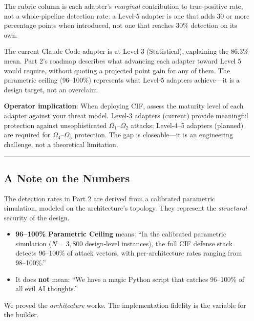 \documentclass[
]{article}
\providecommand{\tightlist}{%
  \setlength{\itemsep}{0pt}\setlength{\parskip}{0pt}}
\begin{document}
The rubric column is each adapter's \emph{marginal} contribution to
true-positive rate, not a whole-pipeline detection rate: a Level-5
adapter is one that adds 30 or more percentage points when introduced,
not one that reaches 30\% detection on its own.

The current Claude Code adapter is at Level 3 (Statistical), explaining
the 86.3\% mean. Part 2's roadmap describes what advancing each adapter
toward Level 5 would require, without quoting a projected point gain for
any of them. The parametric ceiling (96--100\%) represents what Level-5
adapters achieve---it is a design target, not an overclaim.

\textbf{Operator implication}: When deploying CIF, assess the maturity
level of each adapter against your threat model. Level-3 adapters
(current) provide meaningful protection against unsophisticated
\(\Omega_1\)--\(\Omega_2\) attacks; Level-4--5 adapters (planned) are
required for \(\Omega_4\)--\(\Omega_5\) protection. The gap is
closeable---it is an engineering challenge, not a theoretical
limitation.

\begin{center}\rule{0.5\linewidth}{0.5pt}\end{center}

\subsection{A Note on the Numbers}\label{a-note-on-the-numbers}

The detection rates in Part 2 are derived from a calibrated parametric
simulation, modeled on the architecture's topology. They represent the
\emph{structural} security of the design.

\begin{itemize}
\tightlist
\item
  \textbf{96--100\% Parametric Ceiling} means: ``In the calibrated
  parametric simulation (\(N=3{,}800\) design-level instances), the full
  CIF defense stack detects 96--100\% of attack vectors, with
  per-architecture rates ranging from 98--100\%.''
\item
  It does \textbf{not} mean: ``We have a magic Python script that
  catches 96--100\% of all evil AI thoughts.''
\end{itemize}

We proved the \emph{architecture} works. The implementation fidelity is
the variable for the builder.
\end{document}

